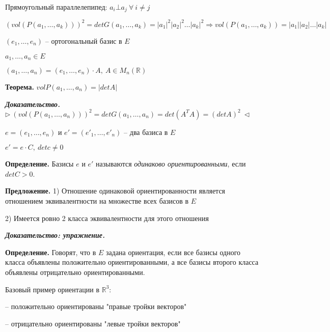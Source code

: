 Прямоугольный параллелепипед: $a_i \bot a_j \ \forall \ i \neq j$

$(vol(P(a_1, \dots, a_k)))^2 = det G(a_1, \dots, a_k) = |a_1|^2 |a_2|^2 \dots |a_k|^2 \Rightarrow vol(P(a_1, \dots, a_k)) = |a_1||a_2| \dots |a_k|$

\vspace{\baselineskip}
$(e_1, \dots, e_n)$ -- ортогональный базис в $E$

$a_1, \dots, a_n \in E$

$(a_1, \dots, a_n) = (e_1, \dots, e_n) \cdot A, \ A \in M_n (\mathbb{R})$

\vspace{\baselineskip}
\textbf{Теорема.} $vol P(a_1, \dots, a_n) = |det A|$

\vspace{\baselineskip}
\textbf{\textit{Доказательство.}} $\rhd \ (vol(P(a_1, \dots, a_n)))^2 = det G(a_1, \dots, a_n) = det (A^T A) = (det A)^2 \ \lhd$

\vspace{\baselineskip}
$e = (e_1, \dots, e_n)$ и $e' = (e'_1, \dots, e'_n)$ -- два базиса в $E$

$e' = e \cdot C, \ detc \neq 0$

\vspace{\baselineskip}
\textbf{Определение.} Базисы $e$ и $e'$ называются \textit{одинаково ориентированными}, если $detC > 0$.

\vspace{\baselineskip}
\textbf{Предложение.} 1) Отношение одинаковой ориентированности является отношением эквивалентности на множестве всех базисов в $E$

2) Имеется ровно 2 класса эквивалентности для этого отношения

\vspace{\baselineskip}
\textbf{\textit{Доказательство: упражнение.}}

\vspace{\baselineskip}
\textbf{Определение.} Говорят, что в $E$ задана ориентация, если все базисы одного класса объявлены положительно ориентированными, а все базисы второго класса объявлены отрицательно ориентированными.

\vspace{\baselineskip}
Базовый пример ориентации в $\mathbb{R}^3$:

-- положительно ориентированы "правые тройки векторов"

-- отрицательно ориентированы "левые тройки векторов"

